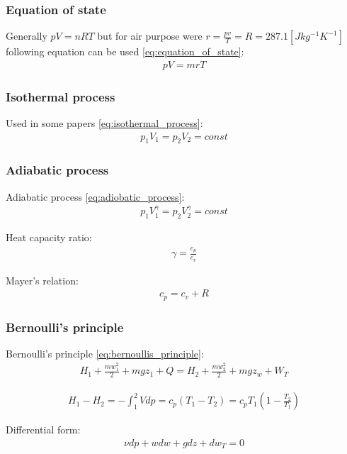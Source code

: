 \documentclass[class=article, crop=false]{standalone}
\begin{document}
\subsubsection{Equation of state}
Generally $pV=nRT$ but for air purpose were $r=\frac{pv}{T}=R=287.1 [Jkg^{-1}K^{-1}]$
following equation can be used \ref{eq:equation_of_state}:
\begin{align}
    pV = mrT
    \label{eq:equation_of_state}
\end{align} 

\subsubsection{Isothermal process}
Used in some papers \ref{eq:isothermal_process}:
\begin{align}
    p_1 V_1 = p_2 V_2 = const
    \label{eq:isothermal_process}
\end{align}
\subsubsection{Adiabatic process}

Adiabatic process \ref{eq:adiobatic_process}:
\begin{align}
     p_1V_1^{\gamma} =  p_2V_2^{\gamma} = const
    \label{eq:adiobatic_process}
\end{align}

Heat capacity ratio:
\begin{align}
    \gamma = \frac{c_p}{c_v}
\end{align}

Mayer's relation:
\begin{align}
    c_p = c_v + R
\end{align}

\subsubsection{Bernoulli's principle}
Bernoulli's principle \ref{eq:bernoullis_principle}:
\begin{align}
    H_1 + \frac{mw_1^2}{2} + mgz_1 + Q = H_2 + \frac{mw_2^2}{2} + mgz_w +
    W_T
    \label{eq:bernoullis_principle}
\end{align}

\begin{align}
    H_1- H_2 = -\int_1^2 V dp = c_p(T_1-T_2) = c_p T_1(1-\frac{T_2}{T_1})
    \label{eq:etalpi_sub}
\end{align}

Differential form:
\begin{align}
    \nu dp + w dw + g dz + dw_T = 0
\end{align}
\end{document}
